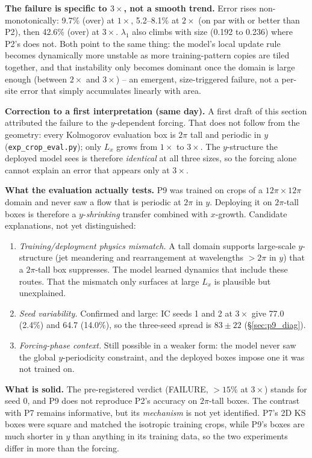 \documentclass[11pt]{article}
\begin{document}
\textbf{The failure is specific to $3\times$, not a smooth trend.} Error
rises non-monotonically: 9.7\% (over) at $1\times$, 5.2--8.1\% at
$2\times$ (on par with or better than P2), then 42.6\% (over) at
$3\times$. $\lambda_1$ also climbs with size (0.192 to 0.236) where
P2's does not. Both point to the same thing: the model's local update
rule becomes dynamically more unstable as more training-pattern copies
are tiled together, and that instability only becomes dominant once the
domain is large enough (between $2\times$ and $3\times$) -- an
emergent, size-triggered failure, not a per-site error that simply
accumulates linearly with area.

\textbf{Correction to a first interpretation (same day).} A first draft
of this section attributed the failure to the $y$-dependent forcing.
That does not follow from the geometry: every Kolmogorov evaluation box
is $2\pi$ tall and periodic in $y$ (\texttt{exp\_crop\_eval.py}); only
$L_x$ grows from $1\times$ to $3\times$. The $y$-structure the deployed
model sees is therefore \emph{identical} at all three sizes, so the
forcing alone cannot explain an error that appears only at $3\times$.

\textbf{What the evaluation actually tests.} P9 was trained on crops of
a $12\pi\times12\pi$ domain and never saw a flow that is periodic at
$2\pi$ in $y$. Deploying it on $2\pi$-tall boxes is therefore a
$y$-\emph{shrinking} transfer combined with $x$-growth. Candidate
explanations, not yet distinguished:
\begin{enumerate}[leftmargin=*]
\item \emph{Training/deployment physics mismatch.} A tall domain
  supports large-scale $y$-structure (jet meandering and rearrangement
  at wavelengths $>2\pi$ in $y$) that a $2\pi$-tall box suppresses. The
  model learned dynamics that include these routes. That the mismatch
  only surfaces at large $L_x$ is plausible but unexplained.
\item \emph{Seed variability.} Confirmed and large: IC seeds 1 and 2
  at $3\times$ give 77.0 (2.4\%) and 64.7 (14.0\%), so the three-seed
  spread is $83\pm22$ (\S\ref{sec:p9_diag}).
\item \emph{Forcing-phase context.} Still possible in a weaker form: the
  model never saw the global $y$-periodicity constraint, and the
  deployed boxes impose one it was not trained on.
\end{enumerate}

\textbf{What is solid.} The pre-registered verdict (FAILURE, $>15\%$
at $3\times$) stands for seed 0, and P9 does not reproduce P2's
accuracy on $2\pi$-tall boxes. The contrast with P7 remains
informative, but its \emph{mechanism} is not yet identified. P7's 2D KS
boxes were square and matched the isotropic training crops, while P9's
boxes are much shorter in $y$ than anything in its training data, so
the two experiments differ in more than the forcing.
\end{document}
